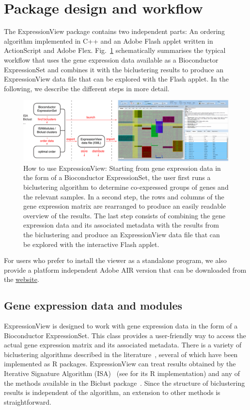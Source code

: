 \documentclass[round]{bioinfo}
\begin{document}
\section{Package design and workflow}
The ExpressionView package contains two independent parts: An ordering
algorithm implemented in C++ and an Adobe Flash applet written in
ActionScript and Adobe Flex. Fig.~\ref{fig:workflow} schematically
summarises the typical workflow that uses the gene expression data
available as a Bioconductor ExpressionSet and combines it with the
biclustering results to produce an ExpressionView data file that can
be explored with the Flash applet. In the following, we describe the
different steps in more detail. 
\begin{figure}[!tpb]
\centerline{\includegraphics[width=0.7\linewidth]{fig1-crop}}
\caption{How to use ExpressionView: Starting from gene expression data
  in the form of a Bioconductor ExpressionSet, the user first runs a
  biclustering algorithm to determine co-expressed groups of genes and
  the relevant samples. In a second step, the rows and columns of the gene
  expression matrix are rearranged to produce an easily readable
  overview of the results. The last step consists of combining the
  gene expression data and its associated metadata with the results
  from the biclustering and produce an ExpressionView data file that
  can be explored with the interactive Flash
  applet.}\label{fig:workflow} 
\end{figure}
For users who prefer to install the viewer as a standalone program, we
also provide a platform independent Adobe AIR version that can be
downloaded from the
\href{http://www.unil.ch/cbg/ExpressionView}{website}. 

\subsection{Gene expression data and modules}
ExpressionView is designed to work with gene expression data in the
form of a Bioconductor ExpressionSet. This class provides a
user-friendly way to access the actual gene expression matrix and its
associated metadata. There is a variety of biclustering algorithms
described in the literature~\citep{madeira04,prelic06}, several of
which have been implemented as R packages. ExpressionView can treat
results obtained by the Iterative Signature Algorithm
(ISA)~\citep{bergmann03} (see \citep{csardi09} for its R
implementation) and any of the methods available in the Biclust
package~\citep{kaiser08}. Since the structure of biclustering results
is independent of the algorithm, an extension to other methods is
straightforward. 
\end{document}

